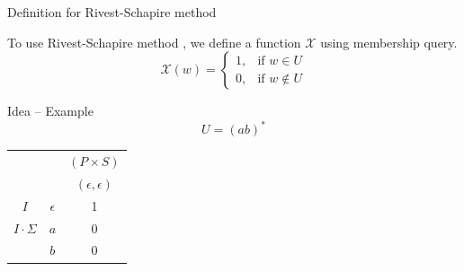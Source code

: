 \documentclass{beamer}
\begin{document}

\begin{frame}{Definition for Rivest-Schapire method}

To use Rivest-Schapire method \cite{rivest1993inference}, we define a function $\mathcal{X}$ using membership query. 
    \[
    \mathcal{X}(w) = \begin{cases} 
        1, & \text{if } w \in U \\ 
        0, & \text{if } w \notin U 
    \end{cases}
    \]
\end{frame}


\begin{frame}{Idea -- Example}
$$
U = (ab)^* 
$$ 


\begin{center}
    \begin{tabular}{|cc|c|}
        \multicolumn{2}{c|}{} & $(P\times S)$ \\
        \multicolumn{2}{c|}{} & $(\epsilon,\epsilon)$ \\ \hline
        $I$ & $\epsilon$ & 1 \\ \hline
        $I \cdot \Sigma$ & $a$ & 0 \\
        & $b$ & 0 \\ \hline
    \end{tabular}
\end{center}
\end{frame}

\end{document}
